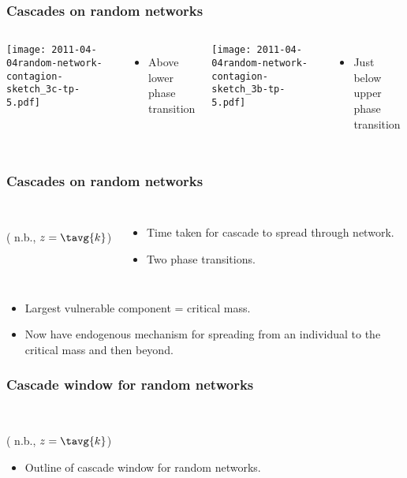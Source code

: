 \begin{frame}
  \frametitle{Cascades on random networks}

  \begin{columns}
    \texttt{[image: 2011-04-04random-network-contagion-sketch\_3c-tp-5.pdf]}
    \begin{itemize}
    \item 
      Above lower phase transition
    \end{itemize}
    \texttt{[image: 2011-04-04random-network-contagion-sketch\_3b-tp-5.pdf]}
    \begin{itemize}
    \item 
      Just below upper phase transition
    \end{itemize}
  \end{columns}

\end{frame}


\begin{frame}
  \frametitle{Cascades on random networks}

    \begin{columns}
      \setlength\fboxsep{0pt}
      \setlength\fboxrule{0.5pt}
      \\
      \small{( n.b., $z = \tavg{k}$)}
      \begin{itemize}
      \item<1-> Time taken for cascade to spread through network.\cite{watts2002a}
      \item<2-> Two phase transitions.
      \end{itemize}
    \end{columns}

    \begin{itemize}
    \item<3-> Largest vulnerable component = \alert{critical mass}.
    \item<4-> Now have endogenous mechanism for spreading from
      an individual to the critical mass and then beyond.
    \end{itemize}

\end{frame}

\begin{frame}
  \frametitle{Cascade window for random networks}

  \begin{center}
    \setlength\fboxsep{0pt}
    \setlength\fboxrule{0.5pt}
    \\
  \end{center}
  \small{( n.b., $z = \tavg{k}$)}
  \begin{itemize}
  \item<1-> Outline of cascade window for random networks. 
  \end{itemize}

\end{frame}

